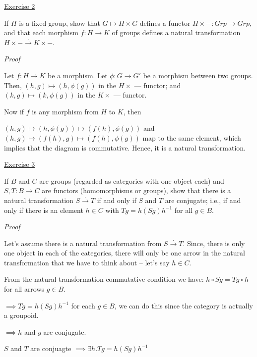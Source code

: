 \documentclass[11pt]{article}
\begin{document}
\vspace{2mm}
\noindent
\underline{Exercise 2}
\vspace{2mm}

If $H$ is a fixed group, show that $G \mapsto H \times G$ defines a functor $H \times - : Grp \to Grp$,
and that each morphism $f : H \to K$ of groups defines a natural transformation $H \times - \xrightarrow{.} K \times -$.

\vspace{2mm}
\noindent
\emph{Proof}

Let $f : H \to K$ be a morphism. Let $\phi : G \to G'$ be a morphism between two groups. Then, $(h, g) \mapsto (h, \phi(g))$ in the $H \times$ --- functor; and $(k, g) \mapsto (k, \phi(g))$ in the $K \times$ --- functor. 

Now if $f$ is any morphism from $H$ to $K$, then 

$(h, g) \mapsto (h, \phi(g)) \mapsto (f(h), \phi(g))$ and $(h, g) \mapsto (f(h), g) \mapsto (f(h), \phi(g))$ map to the same element, which implies that the diagram is commutative. Hence, it is a natural transformation.



\vspace{2mm}
\noindent
\underline{Exercise 3}
\vspace{2mm}

If $B$ and $C$ are groups (regarded as categories with one object each) and
$S, T: B \to C$ are functors (homomorphisms or groups), show that there is a
natural transformation $S \xrightarrow{.} T$ if and only if $S$ and $T$ are conjugate; i.e., if and
only if there is an element $h \in C$ with $Tg = h(Sg)h^{-1}$ for all $g \in B$.

\vspace{2mm}
\noindent
\emph{Proof}

Let's assume there is a natural transformation from $S \xrightarrow{.} T$. Since, there is only one object in each of the categories, there will only be one arrow in the natural transformation that we have to think about -- let's say $h \in C$. 

From the natural transformation commutative condition we have: $h \circ Sg = Tg \circ h$ for all arrows $g \in B$.

$ \implies Tg = h(Sg)h^{-1}$ for each $g \in B$, we can do this since the category is actually a groupoid.

$ \implies h$ and $g$ are conjugate.

$S$ and $T$ are conjuagte $\implies \exists h . Tg = h (Sg) h^{-1}$
\end{document}
